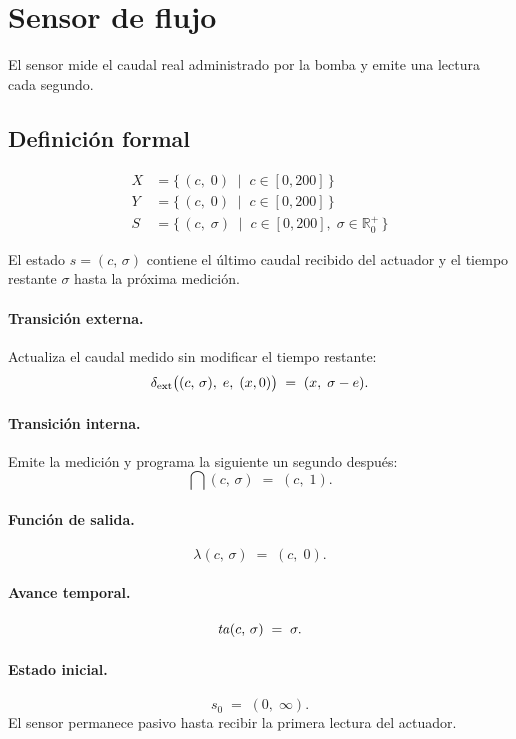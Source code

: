 \section{Sensor de flujo}

El sensor mide el caudal real administrado por la bomba y emite una lectura cada segundo.

\subsection{Definición formal}

\begin{align*}
  X &= \{\,(c,\;0)\;\mid\; c\in[0,200]\,\} \\[4pt]
  Y &= \{\,(c,\;0)\;\mid\; c\in[0,200]\,\} \\[4pt]
  S &= \{\,(c,\;\sigma)\;\mid\; c\in[0,200],\;\sigma\in\mathbb{R}_0^{+}\,\}
\end{align*}

El estado $s = (c,\,\sigma)$ contiene el último caudal recibido del actuador y el tiempo restante $\sigma$ hasta la próxima medición.

\paragraph{Transición externa.}
Actualiza el caudal medido sin modificar el tiempo restante:
\[
  \delta_{\mathrm{ext}}\bigl((c,\,\sigma),\;e,\;(x,0)\bigr)
  \;=\; (x,\;\sigma - e).
\]

\paragraph{Transición interna.}
Emite la medición y programa la siguiente un segundo después:
\[
  \dint(c,\,\sigma) \;=\; (c,\;1).
\]

\paragraph{Función de salida.}
\[
  \lambda(c,\,\sigma) \;=\; (c,\;0).
\]

\paragraph{Avance temporal.}
\[
  \mathit{ta}(c,\,\sigma) \;=\; \sigma.
\]

\paragraph{Estado inicial.}
\[
  s_0 \;=\; (0,\;\infty).
\]
El sensor permanece pasivo hasta recibir la primera lectura del actuador.

